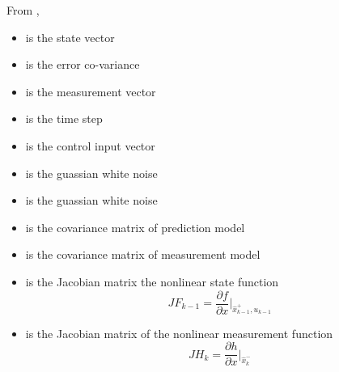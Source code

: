 From \textbf{\tableautorefname{ \ref{Table: Extended Kalman Filter Algorithm}}},
\begin{itemize}
	\item { is the state vector}
	\item { is the error co-variance}
	\item { is the measurement vector}
	\item { is the time step}
	\item { is the control input vector}
	\item { is the guassian white noise}
	\item { is the guassian white noise }
	\item { is the covariance matrix of prediction model}
	\item { is the covariance matrix of measurement model}
	\item { is the Jacobian matrix the nonlinear state function}\\
	\[JF_{k-1} = \frac{\partial f}{\partial x}|_{\hat{x}^+_{k-1},u_{k-1}}\]
	\item { is the Jacobian matrix of the nonlinear measurement function}\\
	\[JH_k = \frac{\partial h}{\partial x}|_{\hat{x}^-_k}\]

	
\end{itemize}


